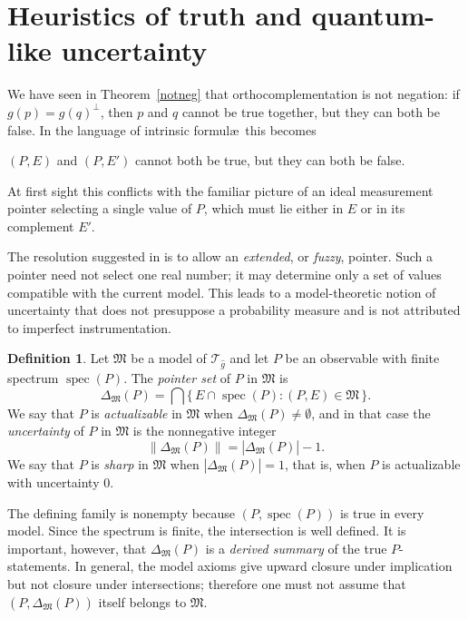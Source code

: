 \documentclass{article}   	%
\theoremstyle{plain}
\theoremstyle{definition}
\newtheorem{definition}[theorem]{Definition}
\theoremstyle{remark}
\DeclareMathOperator{\spec}{spec}
\begin{document}
\section{Heuristics of truth and quantum-like uncertainty}
\label{fuzzy}

We have seen in Theorem~\ref{notneg} that orthocomplementation is not
negation: if $g(p)=g(q)^\perp$, then $p$ and $q$ cannot be true together,
but they can both be false.  In the language of intrinsic formul\ae\ this
becomes
\begin{center}
$(P,E)$ and $(P,E')$ cannot both be true, but they can both be false.
\end{center}
At first sight this conflicts with the familiar picture of an ideal
measurement pointer selecting a single value of $P$, which must lie either in
$E$ or in its complement $E'$.

The resolution suggested in \cite{Malhas1993} is to allow an
\emph{extended}, or \emph{fuzzy}, pointer.  Such a pointer need not select one
real number; it may determine only a set of values compatible with the current
model.  This leads to a model-theoretic notion of uncertainty that does not
presuppose a probability measure and is not attributed to imperfect
instrumentation.

\begin{definition}
\label{def:pointer}
Let $\mathfrak M$ be a model of $\mathcal T_{\widehat g}$ and let $P$ be an
observable with finite spectrum $\spec(P)$.  The \emph{pointer set} of
$P$ in $\mathfrak M$ is
\[
\Delta_{\mathfrak M}(P)
 =\bigcap\{\,E\cap\spec(P):(P,E)\in\mathfrak M\,\}.
\]
We say that $P$ is \emph{actualizable} in $\mathfrak M$ when
$\Delta_{\mathfrak M}(P)\ne\emptyset$, and in that case the
\emph{uncertainty} of $P$ in $\mathfrak M$ is the nonnegative integer
\[
\|\Delta_{\mathfrak M}(P)\|
 =|\Delta_{\mathfrak M}(P)|-1 .
\]
We say that $P$ is \emph{sharp} in $\mathfrak M$ when
$|\Delta_{\mathfrak M}(P)|=1$, that is, when $P$ is actualizable with
uncertainty $0$.
\end{definition}

The defining family is nonempty because $(P,\spec(P))$ is true in every
model.  Since the spectrum is finite, the intersection is well defined.  It
is important, however, that $\Delta_{\mathfrak M}(P)$ is a \emph{derived
summary} of the true $P$-statements.  In general, the model axioms give upward
closure under implication but not closure under intersections; therefore one
must not assume that
$(P,\Delta_{\mathfrak M}(P))$ itself belongs to $\mathfrak M$.
\end{document}
